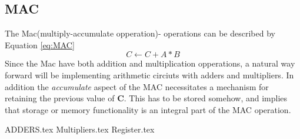 \subsection{MAC}
The Mac(multiply-accumulate opperation)- operations can be described by Equation \ref{eq:MAC}
\begin{equation} \label{eq:MAC}
    C\leftarrow C+A*B
\end{equation}
Since the Mac have both addition and multiplication opperations, a natural way forward will be implementing arithmetic circiuts with adders and multipliers. In addition the \emph{accumulate} aspect of the MAC necessitates a mechanism for retaining the previous value of  \textbf{C}. This has to be stored somehow, and implies that storage or memory functionality is an integral part of the MAC operation.  


{ADDERS.tex}
{Multipliers.tex}
{Register.tex}